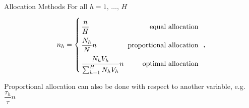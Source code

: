 \documentclass{beamer}\usepackage[]{graphicx}\usepackage[]{color}
\begin{document}
\begin{frame}{Allocation Methods}
For all $h = 1{,}\,\ldots{,}\,H$
 \begin{equation*} \arraycolsep=1.4pt\def\arraystretch{2.2}
  n_h = \left\{ \begin{array}{l r}
        \dfrac{n}{H}  &\; \text{equal allocation} \\
        \dfrac{N_h}{N}  n    &\; \text{proportional allocation} \\
        \dfrac{N_h V_{h}}{\sum_{h=1}^H N_h V_{h} }  n  &\; \text{optimal allocation} 
  \end{array}\;\right.{,}
 \end{equation*}

Proportional allocation can also be done with respect to another variable, e.g. $\dfrac{\tau_h}{\tau}n$

\end{frame}
\end{document}
